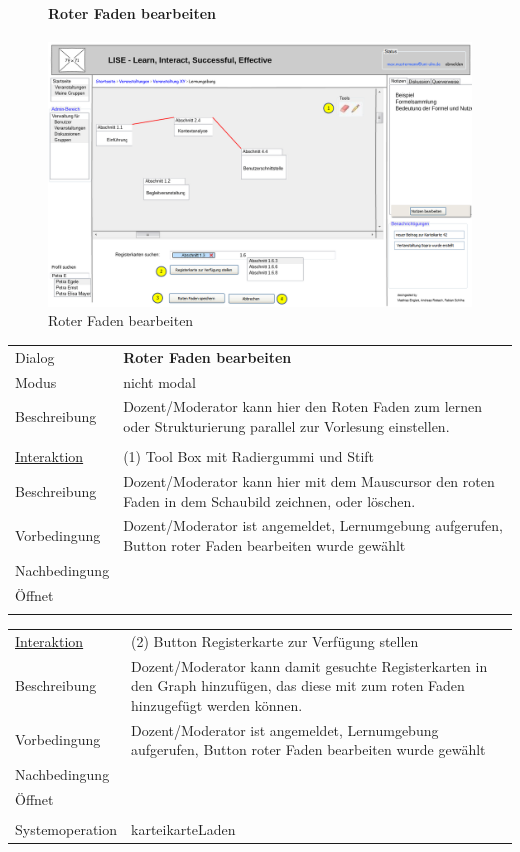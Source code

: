 \documentclass[12pt,a4paper]{article}
\begin{document}
{\begin{figure}[H]
	\centering
	\paragraph{Roter Faden bearbeiten}
	\includegraphics[width=\textwidth]{Bilder/Mockups/GUI/RoterFadenBearbeiten[ModeratorAdmin].png}
	\caption{Roter Faden bearbeiten}
	\label{GuiRoterFadenBearbeiten}
\end{figure}

\begin{tabular}{l p{12cm}}
Dialog 	 		 & \textbf{Roter Faden bearbeiten} \\ 
Modus 			 & nicht modal\\ 
Beschreibung   	 & Dozent/Moderator kann hier den Roten Faden zum lernen oder Strukturierung parallel zur Vorlesung einstellen.\\\\

\underline{Interaktion} & (1) Tool Box mit Radiergummi und Stift \\ 
Beschreibung   	 		& Dozent/Moderator kann hier mit dem Mauscursor den roten Faden in dem Schaubild zeichnen, oder löschen. \\
Vorbedingung	 		& Dozent/Moderator ist angemeldet, Lernumgebung aufgerufen, Button roter Faden bearbeiten wurde gewählt\\
Nachbedingung	 		& \\
Öffnet			 		&  \\\\
\end{tabular}

\begin{tabular}{l p{12cm}}
\underline{Interaktion} & (2) Button Registerkarte zur Verfügung stellen  \\ 
Beschreibung   	 		& Dozent/Moderator kann damit gesuchte Registerkarten in den Graph hinzufügen, das diese mit zum roten Faden hinzugefügt werden können. \\
Vorbedingung	 		& Dozent/Moderator ist angemeldet, Lernumgebung aufgerufen, Button roter Faden bearbeiten wurde gewählt\\
Nachbedingung	 		& \\
Öffnet			 		& \\\\
Systemoperation & karteikarteLaden\\
\end{tabular}

}
\end{document}
